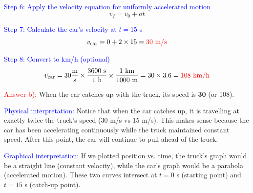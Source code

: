 \begin{exercise}
\begin{solu}
        \textcolor{blue}{Step 6: Apply the velocity equation for uniformly accelerated motion}
        \[
            \boxed{v_f = v_0 + at}
        \]

        \textcolor{blue}{Step 7: Calculate the car's velocity at $t = 15$ s}
        \[
            v_{\text{car}} = 0 + 2 \times 15 = \textcolor{red}{30 \text{ m/s}}
        \]

        \textcolor{blue}{Step 8: Convert to km/h (optional)}
        \[
            v_{\text{car}} = 30 \frac{\text{m}}{\text{s}} \times \frac{3600 \text{ s}}{1 \text{ h}} \times \frac{1 \text{ km}}{1000 \text{ m}} = 30 \times 3.6 = \textcolor{red}{108 \text{ km/h}}
        \]

        \textcolor{red}{Answer b):} When the car catches up with the truck, its speed is \textbf{\qty{30}{\mps}} (or \qty{108}{\kmph}).

        \textcolor{blue}{Physical interpretation:} Notice that when the car catches up, it is travelling at exactly twice the truck's speed (30 m/s vs 15 m/s). This makes sense because the car has been accelerating continuously while the truck maintained constant speed. After this point, the car will continue to pull ahead of the truck.

        \vspace{0.3cm}

        \textcolor{blue}{Graphical interpretation:} If we plotted position vs. time, the truck's graph would be a straight line (constant velocity), while the car's graph would be a parabola (accelerated motion). These two curves intersect at $t = 0$ s (starting point) and $t = 15$ s (catch-up point).
    \end{solu}
\end{exercise}

